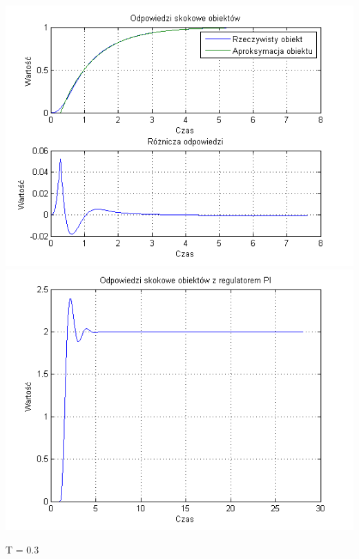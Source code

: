 \documentclass[10pt,a4paper]{article}
\begin{document}
\begin{center}
\includegraphics[scale=1]{images/jeden/skrypt_249.png}\\
\includegraphics[scale=1]{images/jeden/skrypt_250.png}\\
\end{center}
\newpage
T = 0.3
\end{document}
